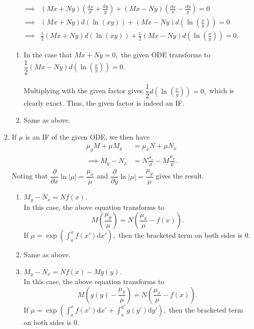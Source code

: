 \documentclass[12pt]{article}
\theoremstyle{definition}
\numberwithin{thm}{section}
\newcommand{\dd}{{\mathrm d}}
\begin{document}
\begin{enumerate}[leftmargin=*, label = Q.\arabic*.]
\begin{align*}
		\implies & (Mx + Ny)\left(\frac{\dd x}{x} + \frac{\dd y}{y}\right) + (Mx - Ny)\left(\frac{\dd x}{x} - \frac{\dd y}{y}\right) = 0\\
		\implies & (Mx + Ny)d(\ln(xy)) + (Mx - Ny)d\left(\ln\left(\frac{x}{y}\right)\right) = 0\\
		\implies & \frac{1}{2}(Mx + Ny)d(\ln(xy)) + \frac{1}{2}(Mx - Ny)d\left(\ln\left(\frac{x}{y}\right)\right) = 0.		 
	\end{align*}
	\begin{enumerate}[label = (\roman*)] 
		\item In the case that $Mx + Ny = 0,$ the given ODE transforms to $\dfrac{1}{2}(Mx - Ny)d\left(\ln\left(\frac{x}{y}\right)\right) = 0.$\\~\\
		Multiplying with the given factor gives $\dfrac{1}{2}d\left(\ln\left(\frac{x}{y}\right)\right) = 0,$ which is clearly exact. Thus, the given factor is indeed an IF.
		\item Same as above.
	\end{enumerate}
	\item If $\mu$ is an IF of the given ODE, we then have
	\begin{align*} 
		\mu_yM + \mu M_y &= \mu_xN + \mu N_x\\
		\implies M_y - N_x &= N\frac{\mu_x}{\mu} - M\frac{\mu_y}{\mu}.
	\end{align*}
	Noting that $\dfrac{\partial}{\partial x}\ln|\mu| = \dfrac{\mu_x}{\mu}$ and $\dfrac{\partial}{\partial y}\ln|\mu| = \dfrac{\mu_y}{\mu}$ gives the result.\\
	\begin{enumerate}[label = (\alph*)] 
		\item $M_y - N_x = Nf(x).$\\
		In this case, the above equation transforms to
		\[M\left(\frac{\mu_y}{\mu}\right) = N\left(\frac{\mu_x}{\mu} - f(x)\right).\]
		If $\mu = \exp\left(\displaystyle\int_{a}^{x} f(x') \text{d}x'\right),$ then the bracketed term on both sides is $0.$
		\item Same as above.
		\item $M_y - N_x = Nf(x) - Mg(y).$\\
		In this case, the above equation transforms to
		\[M\left(g(y) - \frac{\mu_y}{\mu}\right) = N\left(\frac{\mu_x}{\mu} - f(x)\right).\]
		If $\mu = \exp\left(\displaystyle\int_{a}^{x} f(x') \text{d}x' + \int_{a}^{y'} g(y') \text{d}y'\right),$ then the bracketed term on both sides is $0.$
	\end{enumerate}

\end{enumerate}
\end{document}
